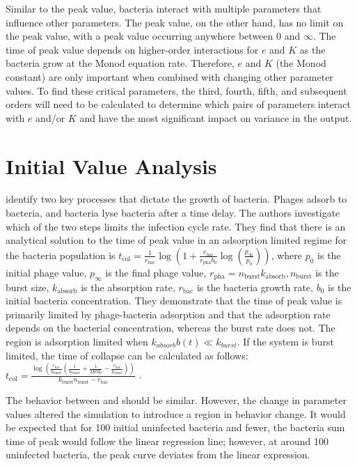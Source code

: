 Similar to the peak value, bacteria interact with multiple parameters that influence other parameters. 
The peak value, on the other hand, has no limit on the peak value, with a peak value occurring anywhere between 0 and $\infty$. 
The time of peak value depends on higher-order interactions for $e$ and $K$ as the bacteria grow at the Monod equation rate. Therefore, $e$ and $K$ (the Monod constant) are only important when combined with changing other parameter values. 
To find these critical parameters, the third, fourth, fifth, and subsequent orders will need to be calculated to determine which pairs of parameters interact with $e$ and/or $K$ and have the most significant impact on variance in the output. 

\section{Initial Value Analysis}
\citet{mullaExtremeDiversityPhage2024} identify two key processes that dictate the growth of bacteria. 
Phages adsorb to bacteria, and bacteria lyse bacteria after a time delay. 
The authors investigate which of the two steps limits the infection cycle rate. 
They find that there is an analytical solution to the time of peak value in an adsorption limited regime for the bacteria population is $t_{\text{col}} = \frac{1}{r_{\text{bac}}} \log\left(1 + \frac{r_{\text{bac}}}{r_{\text{pha}}b_0} \log\left(\frac{p_{\infty}}{p_0}\right)\right)$, where $p_0$ is the initial phage value, $p_\infty$ is the final phage value, $r_{\text{pha}} = n_{\text{burst}} k_{\text{absorb}}, n_{\text{burst}}$ is the burst size, $k_{\text{absorb}}$ is the absorption rate, $r_{\text{bac}}$ is the bacteria growth rate, $b_0$ is the initial bacteria concentration. 
They demonstrate that the time of peak value is primarily limited by phage-bacteria adsorption and that the adsorption rate depends on the bacterial concentration, whereas the burst rate does not. 
The region is adsorption limited when $k_{absorb}b(t) \ll k_{burst}$. 
If the system is burst limited, the time of collapse can be calculated as follows: $t_{\text{col}} = \frac{\log\left(\frac{r_{\text{bac}}}{k_{\text{burst}}}\left(\frac{1}{n_{\text{burst}}} + \frac{1}{\text{MOI}_0} - \frac{r_{\text{bac}}}{k_{\text{burst}}}\right)\right)}{k_{\text{burst}}n_{\text{burst}} - r_{\text{bac}}}$ \cite{mullaExtremeDiversityPhage2024}. 

The behavior between  and  should be similar. However, the change in parameter values altered the simulation to introduce a region in behavior change. 
It would be expected that for 100 initial uninfected bacteria and fewer, the bacteria sum time of peak would follow the linear regression line; however, at around 100 uninfected bacteria, the peak curve deviates from the linear expression. 

